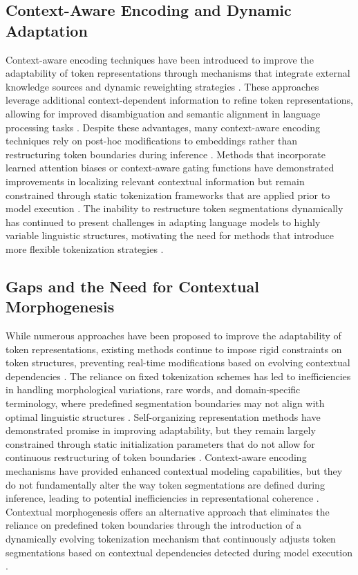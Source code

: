 \documentclass{article}
\begin{document}
\subsection{Context-Aware Encoding and Dynamic Adaptation}

Context-aware encoding techniques have been introduced to improve the adaptability of token representations through mechanisms that integrate external knowledge sources and dynamic reweighting strategies \cite{rikitoshi2024automated, embury2024dynamic}. These approaches leverage additional context-dependent information to refine token representations, allowing for improved disambiguation and semantic alignment in language processing tasks \cite{harcourt2024automated}. Despite these advantages, many context-aware encoding techniques rely on post-hoc modifications to embeddings rather than restructuring token boundaries during inference \cite{durheum2024semantic}. Methods that incorporate learned attention biases or context-aware gating functions have demonstrated improvements in localizing relevant contextual information but remain constrained through static tokenization frameworks that are applied prior to model execution \cite{geline2024linguistic,guerrero2024hierarchical}. The inability to restructure token segmentations dynamically has continued to present challenges in adapting language models to highly variable linguistic structures, motivating the need for methods that introduce more flexible tokenization strategies \cite{gong2024large}.

\subsection{Gaps and the Need for Contextual Morphogenesis}

While numerous approaches have been proposed to improve the adaptability of token representations, existing methods continue to impose rigid constraints on token structures, preventing real-time modifications based on evolving contextual dependencies \cite{la2024neural,firstova2024investigating}. The reliance on fixed tokenization schemes has led to inefficiencies in handling morphological variations, rare words, and domain-specific terminology, where predefined segmentation boundaries may not align with optimal linguistic structures \cite{almir2024transformer}. Self-organizing representation methods have demonstrated promise in improving adaptability, but they remain largely constrained through static initialization parameters that do not allow for continuous restructuring of token boundaries \cite{merrick2024upscaling}. Context-aware encoding mechanisms have provided enhanced contextual modeling capabilities, but they do not fundamentally alter the way token segmentations are defined during inference, leading to potential inefficiencies in representational coherence \cite{kong2024dynamic, amizern2024dynamic}. Contextual morphogenesis offers an alternative approach that eliminates the reliance on predefined token boundaries through the introduction of a dynamically evolving tokenization mechanism that continuously adjusts token segmentations based on contextual dependencies detected during model execution \cite{ashcroft2024evaluation}.
\end{document}
